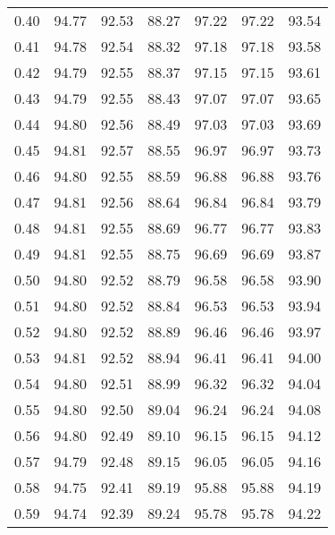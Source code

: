 \begin{tabular}{|c|c|c|c|c|c|c|}
      0.40 &     94.77 &     92.53 &      88.27 &   97.22 &      97.22 &         93.54 \\
      0.41 &     94.78 &     92.54 &      88.32 &   97.18 &      97.18 &         93.58 \\
      0.42 &     94.79 &     92.55 &      88.37 &   97.15 &      97.15 &         93.61 \\
      0.43 &     94.79 &     92.55 &      88.43 &   97.07 &      97.07 &         93.65 \\
      0.44 &     94.80 &     92.56 &      88.49 &   97.03 &      97.03 &         93.69 \\
      0.45 &     94.81 &     92.57 &      88.55 &   96.97 &      96.97 &         93.73 \\
      0.46 &     94.80 &     92.55 &      88.59 &   96.88 &      96.88 &         93.76 \\
      0.47 &     94.81 &     92.56 &      88.64 &   96.84 &      96.84 &         93.79 \\
      0.48 &     94.81 &     92.55 &      88.69 &   96.77 &      96.77 &         93.83 \\
      0.49 &     94.81 &     92.55 &      88.75 &   96.69 &      96.69 &         93.87 \\
      0.50 &     94.80 &     92.52 &      88.79 &   96.58 &      96.58 &         93.90 \\
      0.51 &     94.80 &     92.52 &      88.84 &   96.53 &      96.53 &         93.94 \\
      0.52 &     94.80 &     92.52 &      88.89 &   96.46 &      96.46 &         93.97 \\
      0.53 &     94.81 &     92.52 &      88.94 &   96.41 &      96.41 &         94.00 \\
      0.54 &     94.80 &     92.51 &      88.99 &   96.32 &      96.32 &         94.04 \\
      0.55 &     94.80 &     92.50 &      89.04 &   96.24 &      96.24 &         94.08 \\
      0.56 &     94.80 &     92.49 &      89.10 &   96.15 &      96.15 &         94.12 \\
      0.57 &     94.79 &     92.48 &      89.15 &   96.05 &      96.05 &         94.16 \\
      0.58 &     94.75 &     92.41 &      89.19 &   95.88 &      95.88 &         94.19 \\
      0.59 &     94.74 &     92.39 &      89.24 &   95.78 &      95.78 &         94.22 \\

\end{tabular}
